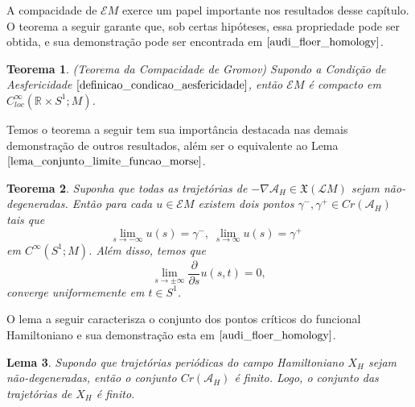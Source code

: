 \documentclass[12pt]{book}
\newtheorem{teorema}{Teorema}[section]
\newtheorem{lema}[teorema]{Lema}
\newcommand{\campohamiltonianoabrev}{X_{H}}
\newcommand{\campossuaves}[1]{\mathfrak{X}(#1)}
\newcommand{\circulo}{S^{1}}
\newcommand{\derivadaparcial}[2]{\frac{\partial #1}{\partial #2}}
\newcommand{\energiafinitaM}{\mathcal{E}M}
\newcommand{\funcionalH}{\mathcal{A}_{H}}
\newcommand{\gradientefuncional}{\nabla \funcionalH}
\newcommand{\pontoscriticos}[1]{\textit{Cr}(#1)}
\newcommand{\retacartesianocirculo}{\real{} \times \circulo}
\newcommand{\real}[1]{\mathbb{R}^{#1}}
\newcommand{\lacocontrateis}{\mathcal{L}M}
\begin{document}
	A compacidade de $\energiafinitaM$ exerce um papel importante nos resultados desse capítulo. O teorema a seguir garante que, sob certas hipóteses, essa propriedade pode ser obtida, e sua demonstração pode ser encontrada em $\cite{audi_floer_homology}$.
	
	\begin{teorema}\label{teorema_compacidade_gromov}
		(Teorema da Compacidade de Gromov) Supondo a Condição de Aesfericidade $\ref{definicao_condicao_aesfericidade}$, então $\energiafinitaM$ é compacto em $C^{\infty}_{loc}(\retacartesianocirculo; M)$.
	\end{teorema}
	
	Temos o teorema a seguir tem sua importância destacada nas demais demonstração de outros resultados, além ser o equivalente ao Lema $\ref{lema_conjunto_limite_funcao_morse}$.
	
	\begin{teorema}
		Suponha que todas as trajetórias de $-\gradientefuncional \in \campossuaves{\lacocontrateis}$ sejam não-degeneradas. Então para cada $u \in \energiafinitaM$ existem dois pontos $\gamma^{-}, \gamma^{+}\in \pontoscriticos{\funcionalH}$ tais que
		$$
		\lim_{s\to -\infty}u(s)=\gamma^{-},\; \lim_{s\to \infty}u(s)=\gamma^{+}\;\;
		$$
		em $C^{\infty}(\circulo;M)$. Além disso, temos que
		$$
		\lim_{s\to \pm \infty}\derivadaparcial{}{s}u(s,t) = 0,
		$$
		converge uniformemente em $t\in \circulo$.
	\end{teorema}
	
	O lema a seguir caracterisza o conjunto dos pontos críticos do funcional Hamiltoniano e sua demonstração esta em $\cite{audi_floer_homology}$. 
	\begin{lema}
		Supondo que  trajetórias periódicas do campo Hamiltoniano $\campohamiltonianoabrev$ sejam não-degeneradas, então o conjunto $\pontoscriticos{\funcionalH}$ é finito. Logo, o conjunto das trajetórias de $\campohamiltonianoabrev$ é finito.
	\end{lema}
\end{document}
